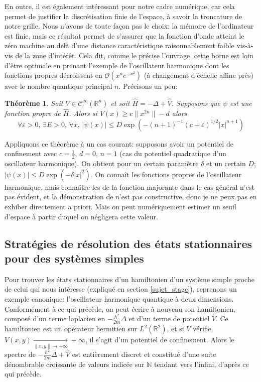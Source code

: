 \documentclass[svgnames,dvipsnames,a4paper,10pt,french]{report}
\newtheorem{theorem}{Théorème}[section]
\begin{document}
En outre, il est également intéressant pour notre cadre numérique, car cela permet de justifier la discrétisation finie de l'espace, à savoir la troncature de notre grille. Nous n'avons de toute façon pas le choix: la mémoire de l'ordinateur est finie, mais ce résultat permet de s'assurer que la fonction d'onde atteint le zéro machine au delà d'une distance caractéristique raisonnablement faible vis-à-vis de la zone d'intérêt. Cela dit, comme le précise l'ouvrage, cette borne est loin d'être optimale en prenant l'exemple de l'oscillateur harmonique dont les fonctions propres décroissent en $\mathcal{O}(x^n e^{-x^2})$ (à changement d'échelle affine près) avec le nombre quantique principal $n$. Précisons un peu:

\begin{theorem}{\cite{simon_pointwise_1975}}
\label{thm_majoration_fct_onde}
    Soit $V\in\mathscr{C}^\infty(\mathbb{R}^n)$ et soit $\hat{H} = -\Delta + \hat{V}$. Supposons que $\psi$ est une fonction propre de $\hat{H}$. Alors si $V(x)\ge c\|x^{2n}\| -d$ alors
    \begin{equation}
        \forall \varepsilon >0, \, \exists E>0, \, \forall x, \, |\psi(x)| \le D \exp(-(n+1)^{-1}(c+\varepsilon)^{1/2}|x|^{n+1})
    \end{equation}
\end{theorem}

Appliquons ce théorème à un cas courant: supposons avoir un potentiel de confinement avec $c=\frac{1}{2}$, $d=0$, $n=1$ (cas du potentiel quadratique d'un oscillateur harmonique).
On obtient pour un certain paramètre $\delta$ et un certain $D$; $|\psi(x)| \le D \exp(-\delta|x|^2)$. On connaît les fonctions propres de l'oscillateur harmonique, mais connaître les de la fonction majorante dans le cas général n'est pas évident, et la démonstration de \cite{simon_pointwise_1975} n'est pas constructive, donc je ne peux pas en exhiber directement a priori. Mais on peut numériquement estimer un seuil d'espace à partir duquel on négligera cette valeur.

\subsection{Stratégies de résolution des états stationnaires pour des systèmes simples}
Pour trouver les états stationnaires d'un hamiltonien d'un système simple proche de celui qui nous intéresse (expliqué en section \ref{sujet_stage}), reprenons un exemple canonique: l'oscillateur harmonique quantique à deux dimensions. Conformément à ce qui précède, on peut écrire à nouveau son hamiltonien, composé d'un terme laplacien en $-\frac{\hbar^2}{2m}\Delta$
 et d'un terme de potentiel $\hat{V}$. Ce hamiltonien est un opérateur hermitien sur $L^2(\mathbb{R}^2)$, et si $V$ vérifie $V(x,y) \xrightarrow[\|x,y\|\rightarrow +\infty]{} + \infty$, il s'agit d'un potentiel de confinement. Alors le spectre de $-\frac{\hbar^2}{2m}\Delta+\hat{V}$ est entièrement discret et constitué d'une suite dénombrable croissante de valeurs indicée sur $\mathbb{N}$ tendant vers l'infini, d'après ce qui précède.
 
\end{document}
